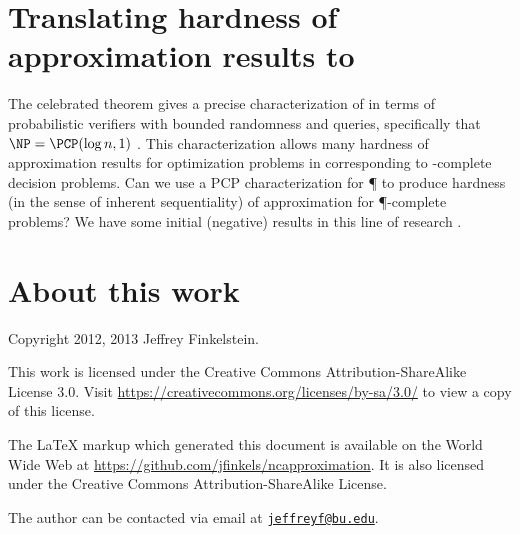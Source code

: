 \documentclass[]{article}
\newcommand{\email}[1]{\href{mailto:#1}{\nolinkurl{#1}}}
\begin{document}
\section{Translating hardness of approximation results to \texorpdfstring{\NC}{NC}}

The celebrated \PCP{} theorem gives a precise characterization of \NP{} in terms of probabilistic verifiers with bounded randomness and queries, specifically that $\NP = \PCP(\log n, 1)$ \cite{pcp}.
This characterization allows many hardness of approximation results for optimization problems in \NPO{} corresponding to \NP-complete decision problems.
Can we use a PCP characterization for \P{} to produce hardness (in the sense of inherent sequentiality) of approximation for \P-complete problems?
We have some initial (negative) results in this line of research \cite{finkelstein13}.

\section{About this work}

Copyright 2012, 2013 Jef{}frey Finkelstein.

This work is licensed under the Creative Commons Attribution-ShareAlike License 3.0.
Visit \mbox{\url{https://creativecommons.org/licenses/by-sa/3.0/}} to view a copy of this license.

The \LaTeX{} markup which generated this document is available on the World Wide Web at \mbox{\url{https://github.com/jfinkels/ncapproximation}}.
It is also licensed under the Creative Commons Attribution-ShareAlike License.

The author can be contacted via email at \email{jeffreyf@bu.edu}.



\end{document}
